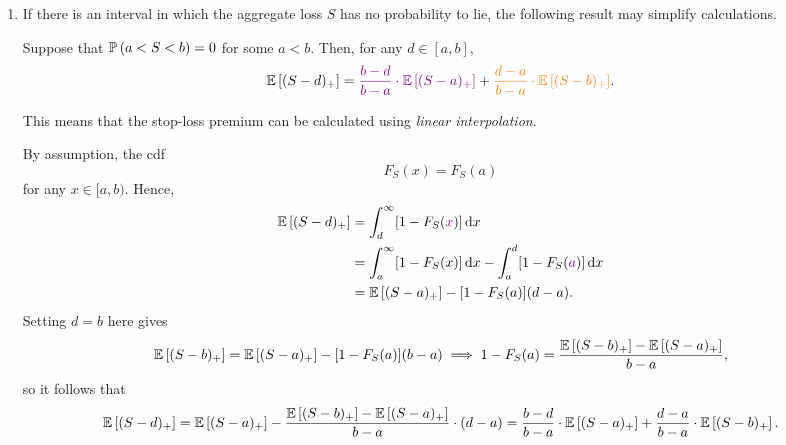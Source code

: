 \begin{enumerate}
\item If there is an interval in which the aggregate loss \(S\) has no
probability to lie, the following result may simplify calculations.
\begin{proposition}
\label{prp:agg-loss-linear-interpol}
Suppose that \(\mathbb{P}\left(a<S<b\right)=0\) for some \(a<b\). Then, for any \(d\in[a,b]\),
\[
\mathbb{E}\left[(S-d)_{+}\right]={\color{violet}\frac{b-d}{b-a}\cdot \mathbb{E}\left[(S-a)_{+}\right]}+
{\color{orange}\frac{d-a}{b-a}\cdot \mathbb{E}\left[(S-b)_{+}\right]}.
\]
\begin{note}
This means that the stop-loss premium can be calculated using \emph{linear
interpolation}.
\end{note}
\end{proposition}
\begin{center}
\end{center}
\begin{pf}
By assumption, the cdf
\[
F_S(x)=F_S(a)
\]
for any \(x\in[a,b)\). Hence,
\begin{align*}
\mathbb{E}\left[(S-d)_{+}\right]&=\int_{d}^{\infty}[1-F_{S}({\color{violet}x})]\dd{x} \\
&=\int_{a}^{\infty}[1-F_{S}(x)]\dd{x}-\int_{a}^{d}[1-F_{S}({\color{violet}a})]\dd{x} \\
&=\mathbb{E}\left[(S-a)_{+}\right]-[1-F_{S}(a)](d-a).
\end{align*}
Setting \(d=b\) here gives
\[
\mathbb{E}\left[(S-b)_{+}\right]=\mathbb{E}\left[(S-a)_{+}\right]-[1-F_{S}(a)](b-a)
\implies 1-F_{S}(a)=\frac{\mathbb{E}\left[(S-b)_{+}\right]-\mathbb{E}\left[(S-a)_{+}\right]}{b-a},
\]
so it follows that
\[
\mathbb{E}\left[(S-d)_{+}\right]=\mathbb{E}\left[(S-a)_{+}\right]-\frac{\mathbb{E}\left[(S-b)_{+}\right]-\mathbb{E}\left[(S-a)_{+}\right]}{b-a}\cdot (d-a)
=\frac{b-d}{b-a}\cdot \mathbb{E}\left[(S-a)_{+}\right]+
\frac{d-a}{b-a}\cdot \mathbb{E}\left[(S-b)_{+}\right].
\]
\end{pf}


\end{enumerate}
